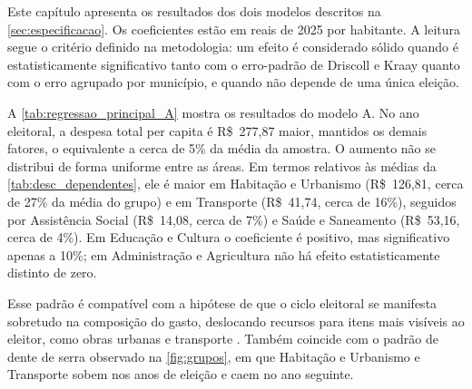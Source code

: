 
Este capítulo apresenta os resultados dos dois modelos descritos na \autoref{sec:especificacao}. Os coeficientes estão em reais de 2025 por habitante. A leitura segue o critério definido na metodologia: um efeito é considerado sólido quando é estatisticamente significativo tanto com o erro-padrão de Driscoll e Kraay quanto com o erro agrupado por município, e quando não depende de uma única eleição.

A \autoref{tab:regressao_principal_A} mostra os resultados do modelo A. No ano eleitoral, a despesa total per capita é R\$~277,87 maior, mantidos os demais fatores, o equivalente a cerca de 5\% da média da amostra. O aumento não se distribui de forma uniforme entre as áreas. Em termos relativos às médias da \autoref{tab:desc_dependentes}, ele é maior em Habitação e Urbanismo (R\$~126,81, cerca de 27\% da média do grupo) e em Transporte (R\$~41,74, cerca de 16\%), seguidos por Assistência Social (R\$~14,08, cerca de 7\%) e Saúde e Saneamento (R\$~53,16, cerca de 4\%). Em Educação e Cultura o coeficiente é positivo, mas significativo apenas a 10\%; em Administração e Agricultura não há efeito estatisticamente distinto de zero.

Esse padrão é compatível com a hipótese de que o ciclo eleitoral se manifesta sobretudo na composição do gasto, deslocando recursos para itens mais visíveis ao eleitor, como obras urbanas e transporte \parencite{drazen2010}. Também coincide com o padrão de dente de serra observado na \autoref{fig:grupos}, em que Habitação e Urbanismo e Transporte sobem nos anos de eleição e caem no ano seguinte.


